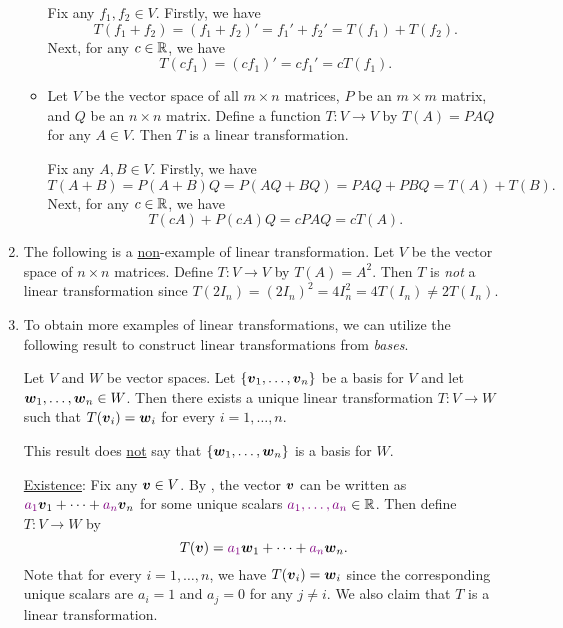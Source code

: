 \begin{enumerate}
\begin{itemize}
\begin{pf}
Fix any \(f_1,f_2\in V\). Firstly, we have
\[
T(f_1+f_2)=(f_1+f_2)'=f_1'+f_2'=T(f_1)+T(f_2).
\]
Next, for any \(c\in\mathbb{R}\), we have
\[
T(cf_1)=(cf_1)'=cf_1'=cT(f_1).
\]
\end{pf}
\item Let \(V\) be the vector space of all \(m\times n\) matrices, \(P\) be an
\(m\times m\) matrix, and \(Q\) be an \(n\times n\) matrix. Define a function
\(T:V\to V\) by \(T(A)=PAQ\) for any \(A\in V\). Then \(T\) is a linear
transformation.

\begin{pf}
Fix any \(A,B\in V\). Firstly, we have
\[
T(A+B)=P(A+B)Q=P(AQ+BQ)=PAQ+PBQ=T(A)+T(B).
\]
Next, for any \(c\in\mathbb{R}\), we have
\[
T(cA)+P(cA)Q=cPAQ=cT(A).
\]
\end{pf}
\end{itemize}
\item The following is a \underline{non}-example of linear transformation. Let
\(V\) be the vector space of \(n\times n\) matrices. Define \(T:V\to V\) by
\(T(A)=A^{2}\). Then \(T\) is \emph{not} a linear transformation since
\(T(2I_n)=(2I_n)^{2}=4I_n^{2}=4T(I_n)\ne 2T(I_n)\).

\item To obtain more examples of linear transformations, we can utilize the
following result to construct linear transformations from \emph{bases}.

\begin{theorem}
\label{thm:construct-lt-from-basis}
Let \(V\) and \(W\) be vector spaces. Let \(\{\vb*{v}_1,\dotsc,\vb*{v}_n\}\)
be a basis for \(V\) and let \(\vb*{w}_1,\dotsc,\vb*{w}_n\in W\). Then there
exists a unique linear transformation \(T:V\to W\) such that
\(T(\vb*{v}_i)=\vb*{w}_i\) for every \(i=1,\dotsc,n\).
\end{theorem}
\begin{note}
This result does \underline{not} say that \(\{\vb*{w}_1,\dotsc,\vb*{w}_n\}\)
is a basis for \(W\).
\end{note}

\begin{pf}
\underline{Existence}: Fix any \(\vb*{v}\in V\). By
, the vector \(\vb*{v}\) can be written as
\({\color{violet}a_1}\vb*{v}_1+\dotsb+{\color{violet}a_n}\vb*{v}_n\) for some unique scalars
\({\color{violet}a_1,\dotsc,a_n}\in\mathbb{R}\). Then define \(T:V\to W\) by
\[
T(\vb*{v})={\color{violet}a_1}\vb*{w}_1+\dotsb+{\color{violet}a_n}\vb*{w}_n.
\]
Note that for every \(i=1,\dotsc,n\), we have \(T(\vb*{v}_i)=\vb*{w}_i\)
since the corresponding unique scalars are \(a_i=1\) and \(a_j=0\) for any
\(j\ne i\). We also claim that \(T\) is a linear transformation.


\end{pf}
\end{enumerate}
